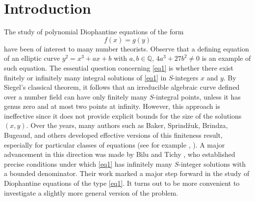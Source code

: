 \documentclass[12pt]{amsart}
\newcommand{\Q}{\mbox{$\mathbb Q$}}
\begin{document}
	\section{Introduction}
	The study of polynomial Diophantine equations of    the form
	\begin{equation}\label{eq1}
		f(x)=g(y)
	\end{equation} 
    have been of interest to many number theorists. Observe that a defining equation of an elliptic curve $y^2=x^3+ax+b$ with $a,b\in \Q$, $4a^3+27b^2\neq 0$ is an example of such equation.  The essential question concerning \eqref{eq1} is whether there exist finitely or infinitely many integral solutions of \eqref{eq1} in $S$-integers $x$ and $y$. By Siegel’s classical theorem, it follows that an irreducible algebraic curve defined over a number field can have only finitely many $S$-integral points, unless it has genus zero and at most two points at infinity. However, this approach is ineffective since it does not provide explicit bounds for the size of the solutions $(x,y)$.  Over the years, many authors such as Baker, Sprindžuk, Brindza, Bugeaud, and others developed effective versions of this finiteness result, especially for particular classes of equations (see for example \cite{baker1969bounds}, \cite{sprindzuk1982classical}). A major advancement in this direction was made by Bilu and Tichy \cite{bilu2000diophantine}, who established precise conditions under which \eqref{eq1} has infinitely many $S$-integer solutions with a bounded denominator. Their work marked a major step forward  in the study of Diophantine equations of the type \eqref{eq1}. It turns out to be more convenient to investigate a slightly more general version of the problem.
\end{document}
